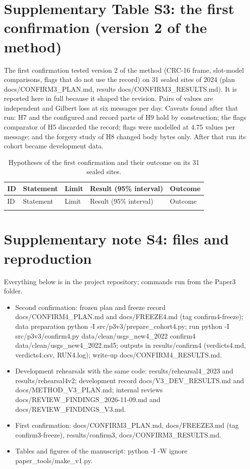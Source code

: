 ﻿\documentclass[12pt]{article}
\begin{document}
\section*{Supplementary Table S3: the first confirmation (version 2 of the method)}
The first confirmation tested version 2 of the method (CRC-16 frame, slot-model comparisons, flags that do not use the record) on 31 sealed sites of 2024 (plan docs/CONFIRM3\_PLAN.md, results docs/CONFIRM3\_RESULTS.md). It is reported here in full because it shaped the revision. Pairs of values are independent and Gilbert loss at six messages per day. Caveats found after that run: H7 and the configured and record parts of H9 hold by construction; the flags comparator of H5 discarded the record; flags were modelled at 4.75 values per message; and the forgery study of H8 changed body bytes only. After that run its cohort became development data.

{\footnotesize
\begin{longtable}{@{}p{0.6cm}p{3.2cm}p{2.2cm}p{5.8cm}p{1.6cm}@{}}
\caption{Hypotheses of the first confirmation and their outcome on its 31 sealed sites.}\\
\toprule
ID & Statement & Limit & Result (95\% interval) & Outcome \\
\midrule
\endfirsthead
\toprule
ID & Statement & Limit & Result (95\% interval) & Outcome \\
\midrule
\endhead
\bottomrule
\endfoot

\end{longtable}
}

\section*{Supplementary note S4: files and reproduction}
Everything below is in the project repository; commands run from the Paper3 folder.
\begin{itemize}
  \item Second confirmation: frozen plan and freeze record docs/CONFIRM4\_PLAN.md and docs/FREEZE4.md (tag confirm4-freeze); data preparation python -I src/p3v3/prepare\_cohort4.py; run python -I src/p3v3/confirm4.py data/clean/usgs\_new4\_2022 confirm4 data/clean/usgs\_new4\_2022.md5; outputs in results/confirm4 (verdicts4.md, verdicts4.csv, RUN4.log); write-up docs/CONFIRM4\_RESULTS.md.
  \item Development rehearsals with the same code: results/rehearsal4\_2023 and results/rehearsal4v2; development record docs/V3\_DEV\_RESULTS.md and docs/METHOD\_V3\_PLAN.md; internal reviews docs/REVIEW\_FINDINGS\_2026-11-09.md and docs/REVIEW\_FINDINGS\_V3.md.
  \item First confirmation: docs/CONFIRM3\_PLAN.md, docs/FREEZE3.md (tag confirm3-freeze), results/confirm3, docs/CONFIRM3\_RESULTS.md.
  \item Tables and figures of the manuscript: python -I -W ignore paper\_tools/make\_v1.py.
\end{itemize}
\end{document}
